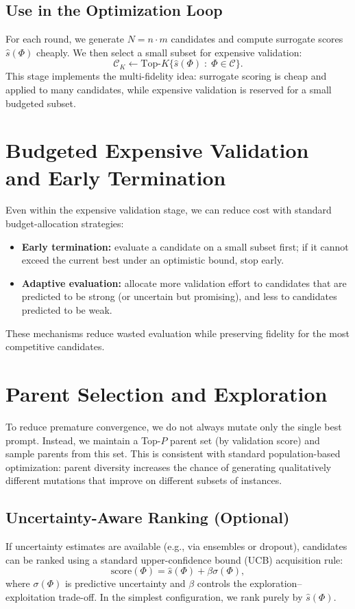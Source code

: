 \subsection{Use in the Optimization Loop}
For each round, we generate $N=n\cdot m$ candidates and compute surrogate scores $\widehat{s}(\Phi)$ cheaply. We then select a small subset for expensive validation:
\[
\mathcal{C}_K \leftarrow \text{Top-}K\{\widehat{s}(\Phi)\;:\;\Phi\in\mathcal{C}\}.
\]
This stage implements the multi-fidelity idea: surrogate scoring is cheap and applied to many candidates, while expensive validation is reserved for a small budgeted subset.

\section{Budgeted Expensive Validation and Early Termination}
Even within the expensive validation stage, we can reduce cost with standard budget-allocation strategies:
\begin{itemize}
    \item \textbf{Early termination:} evaluate a candidate on a small subset first; if it cannot exceed the current best under an optimistic bound, stop early.
    \item \textbf{Adaptive evaluation:} allocate more validation effort to candidates that are predicted to be strong (or uncertain but promising), and less to candidates predicted to be weak.
\end{itemize}
These mechanisms reduce wasted evaluation while preserving fidelity for the most competitive candidates.

\section{Parent Selection and Exploration}
To reduce premature convergence, we do not always mutate only the single best prompt. Instead, we maintain a Top-$P$ parent set (by validation score) and sample parents from this set. This is consistent with standard population-based optimization: parent diversity increases the chance of generating qualitatively different mutations that improve on different subsets of instances.

\subsection{Uncertainty-Aware Ranking (Optional)}
If uncertainty estimates are available (e.g., via ensembles or dropout), candidates can be ranked using a standard upper-confidence bound (UCB) acquisition rule:
\[
\text{score}(\Phi) = \widehat{s}(\Phi) + \beta \sigma(\Phi),
\]
where $\sigma(\Phi)$ is predictive uncertainty and $\beta$ controls the exploration--exploitation trade-off. In the simplest configuration, we rank purely by $\widehat{s}(\Phi)$.

